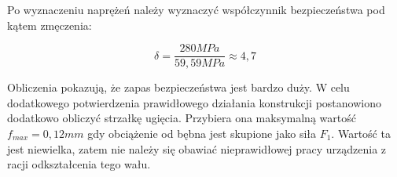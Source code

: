 			Po wyznaczeniu naprężeń należy wyznaczyć współczynnik bezpieczeństwa pod kątem zmęczenia:
			
			\begin{equation}
			\delta=\frac{280 MPa}{59,59 MPa} \approx 4,7
			\end{equation}
			
			Obliczenia pokazują, że zapas bezpieczeństwa jest bardzo duży. 
			W celu dodatkowego potwierdzenia prawidłowego działania konstrukcji postanowiono dodatkowo obliczyć strzałkę ugięcia.
			Przybiera ona maksymalną wartość $f_{max}=0,12 mm$ gdy obciążenie od bębna jest skupione jako siła $F_1$.
			Wartość ta jest niewielka, zatem nie należy się obawiać nieprawidłowej pracy urządzenia z racji odkształcenia tego wału.
			
			
			
			